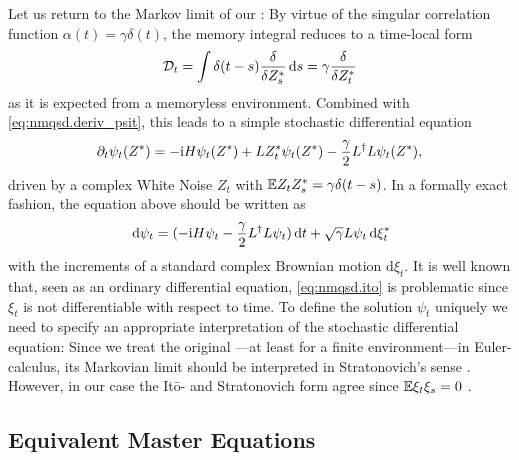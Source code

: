Let us return to the Markov limit of our \NMSSE:
By virtue of the singular correlation function $\alpha(t) = \gamma\delta(t)$, the memory integral reduces to a time-local form
\begin{equation*}
  \mathcal{D}_t = \int \delta(t - s) \frac{\delta}{\delta {Z}^*_s}\, \mathrm{d} s = \gamma\frac{\delta}{\delta {Z}^*_t}
\end{equation*}
as it is expected from a memoryless environment.
Combined with \autoref{eq:nmqsd.deriv_psit}, this leads to a simple stochastic differential equation
\begin{equation}
  \partial_t \psi_t({Z}^*) = -\mathrm{i} H \psi_t({Z}^*) + L{Z}^*_t\psi_t({Z}^*) - \frac{\gamma}{2}L^\dagger L\psi_t({Z}^*),
  \label{eq:nmqsd.markov}
\end{equation}
driven by a complex White Noise $Z_t$ with $\E{Z_t \ZZ_s} = \gamma\delta(t-s)$.
In a formally exact fashion, the equation above should be written as
\begin{equation}
  \, \mathrm{d}\psi_t = (-\mathrm{i}H\psi_t - \frac{\gamma}{2} L^\dagger L \psi_t) \, \mathrm{d} t + \sqrt{\gamma} L\psi_t \, \mathrm{d} {\xi}^*_t
  \label{eq:nmqsd.ito}
\end{equation}
with the increments of a standard complex Brownian motion $\mathrm{d}\xi_t$.
It is well known that, seen as an ordinary differential equation, \autoref{eq:nmqsd.ito} is problematic since $\xi_t$ is not differentiable with respect to time.
To define the solution $\psi_t$ uniquely we need to specify an appropriate interpretation of the stochastic differential equation:
Since we treat the original \NMSSE---at least for a finite environment---in Euler-calculus, its Markovian limit should be interpreted in Stratonovich's sense \cite{Ok03_sde}.
However, in our case the It\=o- and Stratonovich form agree since $\E \xi_t \xi_s = 0$ \cite{GaCr85_handbook}.

\subsection{Equivalent Master Equations}
\label{sub:nmqsd.lin_nmsse.master}

